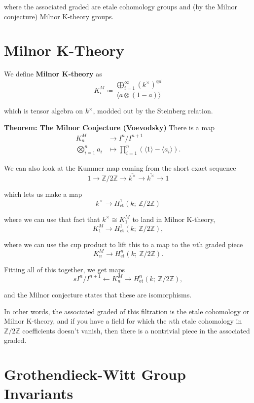 \documentclass[11pt]{scrreprt}
\theoremstyle{definition}
\newcommand{\ZZ}[0]{{\mathbb{Z}}}
\newcommand{\generators}[1]{\langle{#1}\rangle}
\newcommand{\tensor}[0]{\otimes}
\newcommand{\from}[0]{\leftarrow}
\newcommand{\definedas}[0]{\coloneqq}
\begin{document}
where the associated graded are etale cohomology groups and (by the
Milnor conjecture) Milnor K-theory groups.

\hypertarget{milnor-k-theory}{%
\section{Milnor K-Theory}\label{milnor-k-theory}}

We define \textbf{Milnor K-theory} as \[
K_i^M \definedas \frac{\bigoplus_{i=1}^\infty  (k^\times)^{\tensor i} } {\generators{a\tensor(1-a)}}
\]

which is tensor algebra on \(k^\times\), modded out by the Steinberg
relation.

\textbf{Theorem: The Milnor Conjecture (Voevodsky)} There is a map
\begin{align*}
K_n^M &\to I^n/I^{n+1} \\
\bigotimes_{i=1}^n a_i &\mapsto \prod_{i=1}^n \left(\generators{1} - \generators{a_i}\right).
\end{align*}

We can also look at the Kummer map coming from the short exact sequence
\[
1\to \ZZ/2\ZZ \to \overline {k^\times} \to \overline{k^\times} \to 1
\]

which lets us make a map \[
k^\times \to H_\text{et}^1(k;~\ZZ/2\ZZ)
\]

where we can use that fact that \(k^\times \cong K^M_1\) to land in
Milnor K-theory, \[
K_1^M \to H_\text{et}^1(k;~\ZZ/2\ZZ),
\]

where we can use the cup product to lift this to a map to the \(n\)th
graded piece \[
K_n^M \to H_\text{et}^n(k;~\ZZ/2\ZZ).
\]

Fitting all of this together, we get maps \[s
I^n/I^{n+1} \from K_n^M \to H_\text{et}^n(k;~\ZZ/2\ZZ),
\]

and the Milnor conjecture states that these are isomorphisms.

In other words, the associated graded of this filtration is the etale
cohomology or Milnor K-theory, and if you have a field for which the
\(n\)th etale cohomology in \(\ZZ/2\ZZ\) coefficients doesn't vanish,
then there is a nontrivial piece in the associated graded.

\hypertarget{grothendieck-witt-group-invariants}{%
\section{Grothendieck-Witt Group
Invariants}\label{grothendieck-witt-group-invariants}}
\end{document}
